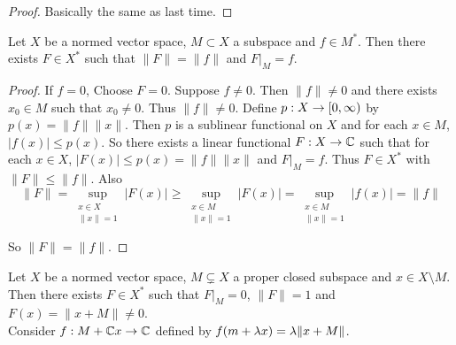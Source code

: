 \documentclass{book}
\begin{document}
	\begin{proof}
	Basically the same as last time.
	\end{proof}
	
	\begin{ex} 
		Let $X$ be a normed vector space, $M \subset X$ a subspace and $f \in M^*$. Then there exists $F \in X^*$ such that $\|F \|= \|f \|$ and $F|_M = f$.  
	\end{ex}
	
	\begin{proof}
		If $f =0$, Choose $F=0$. Suppose $f \neq 0$. Then $\|f \|\neq 0$ and there exists $x_0 \in M$ such that $x_0  \neq 0$. Thus $\|f \| \neq 0$. Define $p:X \rightarrow [0,\infty)$ by $ p(x) = \|f \|\|x \|$. Then $p$ is a sublinear functional on $X$ and for each $x \in M$, $\vert f(x) \vert \leq p(x)$. So there exists a linear functional $F:X \rightarrow \mathbb{C}$ such that for each $x \in X$, $\vert F(x) \vert \leq p(x) = \|f \|\|x \|$ and $F|_M = f$. Thus $F \in X^*$ with $\|F \|\leq \|f \|$. Also $$\|F \|= \sup_{\substack{ x \in X \\ \|x \|= 1}} \vert F(x) \vert \geq  \sup_{\substack{ x \in M \\ \|x \|= 1}} \vert F(x) \vert = \sup_{\substack{ x \in M \\ \|x \|= 1}} \vert f(x) \vert = \|f \|$$
		
		So $\|F \|= \|f \|$.
	\end{proof}
	
	\begin{ex} 
		Let $X$ be a normed vector space, $M \subsetneq X$ a proper closed subspace and $x \in X \setminus M$. Then there exists $F \in X^*$ such that $F|_M = 0$, $\|F \|=1$ and $ F(x) = \|x+M \|\neq 0$. \\
		 Consider $f:M+\mathbb{C} x \rightarrow \mathbb{C}$ defined by $f(m+\lambda x) = \lambda \|x +M \|$.
	\end{ex}
	
\end{document}
